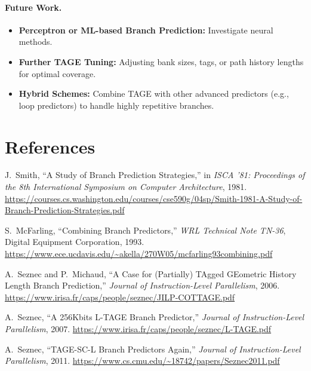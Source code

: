 \documentclass[11pt]{article}
\begin{document}
\paragraph{Future Work.}
\begin{itemize}
    \item \textbf{Perceptron or ML-based Branch Prediction:} Investigate neural methods.
    \item \textbf{Further TAGE Tuning:} Adjusting bank sizes, tags, or path history lengths for optimal coverage.
    \item \textbf{Hybrid Schemes:} Combine TAGE with other advanced predictors (e.g., loop predictors) to handle highly repetitive branches.
\end{itemize}

\section*{References}
\begingroup
\renewcommand{\section}[2]{}
\begin{thebibliography}{9}

J.~Smith,
\newblock ``A Study of Branch Prediction Strategies,''
\newblock in \emph{ISCA '81: Proceedings of the 8th International Symposium on Computer Architecture}, 1981.
\newblock \url{https://courses.cs.washington.edu/courses/cse590g/04sp/Smith-1981-A-Study-of-Branch-Prediction-Strategies.pdf}

S.~McFarling,
\newblock ``Combining Branch Predictors,''
\newblock \emph{WRL Technical Note TN-36}, Digital Equipment Corporation, 1993.
\newblock \url{https://www.ece.ucdavis.edu/~akella/270W05/mcfarling93combining.pdf}

A.~Seznec and P.~Michaud,
\newblock ``A Case for (Partially) TAgged GEometric History Length Branch Prediction,''
\newblock \emph{Journal of Instruction-Level Parallelism}, 2006.
\newblock \url{https://www.irisa.fr/caps/people/seznec/JILP-COTTAGE.pdf}

A.~Seznec,
\newblock ``A 256Kbits L-TAGE Branch Predictor,''
\newblock \emph{Journal of Instruction-Level Parallelism}, 2007.
\newblock \url{https://www.irisa.fr/caps/people/seznec/L-TAGE.pdf}

A.~Seznec,
\newblock ``TAGE-SC-L Branch Predictors Again,''
\newblock \emph{Journal of Instruction-Level Parallelism}, 2011.
\newblock \url{https://www.cs.cmu.edu/~18742/papers/Seznec2011.pdf}

\end{thebibliography}
\endgroup
\end{document}
